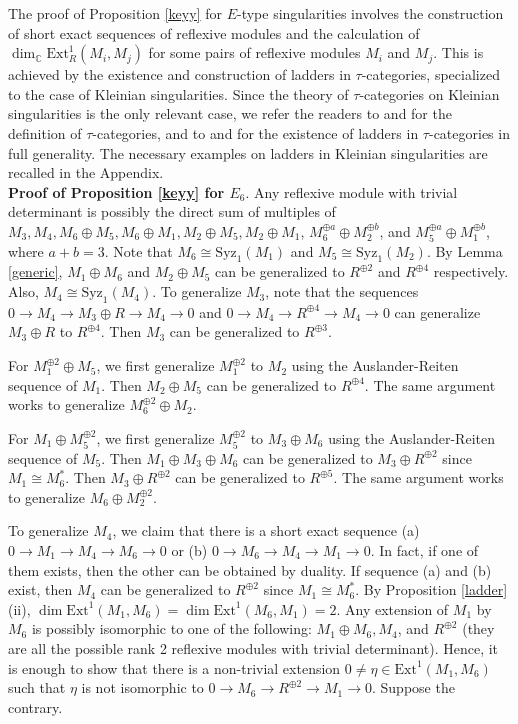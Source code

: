 \documentclass{amsart}[12pt]
\theoremstyle{definition}
\theoremstyle{remark}
\numberwithin{equation}{section}
\begin{document}
The proof of Proposition \ref{keyy} for $E$-type singularities involves the construction of short exact sequences of reflexive modules and the calculation of $\dim_{\mathbb{C}} \mathrm{Ext}^1_R(M_i, M_j)$ for some pairs of reflexive modules $M_i$ and $M_j$. This is achieved by the existence and construction of ladders in $\tau$-categories, specialized to the case of Kleinian singularities. Since the theory of $\tau$-categories on Kleinian singularities is the only relevant case, we refer the readers to \cite[2.1]{I05} and \cite[Definition 4.2]{IM} for the definition of $\tau$-categories, and to \cite[Theorem 3.3, 4.1]{I05} and \cite[Theorem 4.4, 4.5, 4.8, 4.9]{IM} for the existence of ladders in $\tau$-categories in full generality. The necessary examples on ladders in Kleinian singularities are recalled in the Appendix.
\\

\noindent \textbf{Proof of Proposition \ref{keyy} for $E_6$}.
Any reflexive module with trivial determinant is possibly the direct sum of multiples of $M_3, M_4, M_6 \oplus M_5, M_6 \oplus M_1, M_2 \oplus M_5, M_2 \oplus M_1$, $M_6^{\oplus a} \oplus M_2^{\oplus b}$, and $M_5^{\oplus a} \oplus M_1^{\oplus b}$, where $a + b = 3$. Note that $M_6 \cong \mathrm{Syz}_1(M_1)$ and $M_5 \cong \mathrm{Syz}_1(M_2)$. By Lemma \ref{generic}, $M_1 \oplus M_6$ and $M_2 \oplus M_5$ can be generalized to $R^{\oplus 2}$ and $R^{\oplus 4}$ respectively. Also, $M_4 \cong \mathrm{Syz}_1(M_4)$. To generalize $M_3$, note that the sequences $0 \to M_4 \to M_3 \oplus R \to M_4 \to 0$ and $0 \to M_4 \to R^{\oplus 4} \to M_4 \to 0$ can generalize $M_3 \oplus R$ to $R^{\oplus 4}$. Then $M_3$ can be generalized to $R^{\oplus 3}$. 

For $M_1^{\oplus 2} \oplus M_5$, we first generalize $M_1^{\oplus 2}$ to $M_2$ using the Auslander-Reiten sequence of $M_1$. Then $M_2 \oplus M_5$ can be generalized to $R^{\oplus 4}$. The same argument works to generalize $M_6^{\oplus 2} \oplus M_2$.

For $M_1 \oplus M_5^{\oplus 2}$, we first generalize $M_5^{\oplus 2}$ to $M_3 \oplus M_6$ using the Auslander-Reiten sequence of $M_5$. Then $M_1 \oplus M_3 \oplus M_6$ can be generalized to $M_3 \oplus R^{\oplus 2}$ since $M_1 \cong M_6^*$. Then $M_3 \oplus R^{\oplus 2}$ can be generalized to $R^{\oplus 5}$. The same argument works to generalize $M_6 \oplus M_2^{\oplus 2}$.

To generalize $M_4$, we claim that there is a short exact sequence (a) $0 \to M_1 \to M_4 \to M_6 \to 0$ or (b) $0 \to M_6 \to M_4 \to M_1 \to 0$. In fact, if one of them exists, then the other can be obtained by duality. If sequence (a) and (b) exist, then $M_4$ can be generalized to $R^{\oplus 2}$ since $M_1 \cong M_6^*$. By Proposition \ref{ladder}(ii), $\dim \mathrm{Ext}^1(M_1, M_6) = \dim \mathrm{Ext}^1(M_6, M_1) = 2$. Any extension of $M_1$ by $M_6$ is possibly isomorphic to one of the following: $M_1 \oplus M_6, M_4$, and $R^{\oplus 2}$ (they are all the possible rank 2 reflexive modules with trivial determinant). Hence, it is enough to show that there is a non-trivial extension $0 \neq \eta \in \mathrm{Ext}^1(M_1, M_6)$ such that $\eta$ is not isomorphic to $0 \to M_6 \to R^{\oplus 2} \to M_1 \to 0$. Suppose the contrary. 
\end{document}
